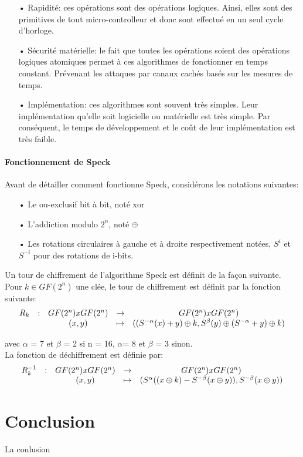 			\begin{enumerate}
			\item[•] Rapidité: ces opérations sont des opérations logiques. Ainsi, elles sont
				des primitives de tout micro-controlleur et donc sont effectué en un seul
				cycle d'horloge.
			\item[•] Sécurité matérielle: le fait que toutes les opérations soient des opérations
				logiques atomiques permet à ces algorithmes de fonctionner en temps constant.
				Prévenant les attaques par canaux cachés basés sur les mesures de temps.
			\item[•] Implémentation: ces algorithmes sont souvent très simples. Leur implémentation
				qu'elle soit logicielle ou matérielle est très simple. Par conséquent, le
				temps de développement et le coût de leur implémentation est très faible.
			\end{enumerate}

		\subsection{Fonctionnement de Speck}

			Avant de détailler comment fonctionne Speck, considérons les notations suivantes:

			\begin{enumerate}
			  \item[•] Le ou-exclusif bit à bit, noté xor
			  \item[•] L'addiction modulo $2^n$, noté $\mathbin{\oplus}$
			  \item[•] Les rotations circulaires à gauche et à droite respectivement notées,
			    $S^i$ et $S^{-i}$ pour des rotations de i-bits.
			\end{enumerate}

			Un tour de chiffrement de l'algorithme Speck est définit de la façon suivante. \\
			Pour $k \in GF(2^n)$ une clée, le tour de chiffrement est définit par la fonction suivante:
			\[
			\begin{array}{ccccc}
			R_k & : & GF(2^n) x GF(2^n) & \to & GF(2^n) x GF(2^n) \\
			 & & (x,y) & \mapsto & ((S^{-\alpha}(x) + y) \mathbin{\oplus} k, S^\beta (y) \mathbin{\oplus} (S^{-\alpha} + y) \mathbin{\oplus} k) \\
			\end{array}
			\]

			avec $\alpha$ = 7 et $\beta$ = 2 si n = 16, $\alpha $= 8 et $\beta$ = 3 sinon. \\

			La fonction de déchiffrement est définie par:
			\[
			\begin{array}{ccccc}
			R_k^{-1} & : & GF(2^n) x GF(2^n) & \to & GF(2^n) x GF(2^n) \\
			 & & (x,y) & \mapsto & (S^\alpha ((x \mathbin{\oplus} k) - S^{-\beta}(x \mathbin{\oplus} y)), S^{-\beta}(x \mathbin{\oplus} y)) \\
			\end{array}
			\]


\newpage
\part*{Conclusion}

		La conlusion

